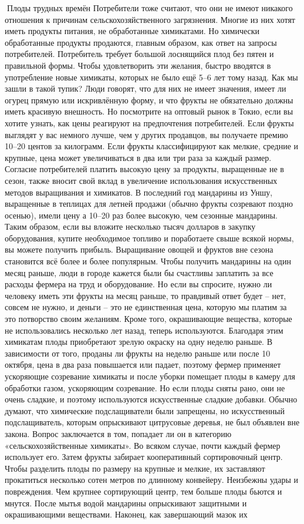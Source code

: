 \documentclass[a4paper]{book}
\begin{document}
Плоды трудных времён
Потребители тоже считают, что они не имеют никакого отношения к причинам
сельскохозяйственного загрязнения. Многие из них хотят иметь продукты питания, не
обработанные химикатами. Но химически обработанные продукты продаются, главным
образом, как ответ на запросы потребителей. Потребитель требует большой лоснящийся
плод без пятен и правильной формы. Чтобы удовлетворить эти желания, быстро вводятся в
употребление новые химикаты, которых не было ещё 5–6 лет тому назад.
Как мы зашли в такой тупик? Люди говорят, что для них не имеет значения, имеет ли
огурец прямую или искривлённую форму, и что фрукты не обязательно должны иметь
красивую внешность. Но посмотрите на оптовый рынок в Токио, если вы хотите узнать, как
цены реагируют на предпочтения потребителей. Если фрукты выглядят у вас немного лучше,
чем у других продавцов, вы получаете премию 10–20 центов за килограмм. Если фрукты
классифицируют как мелкие, средние и крупные, цена может увеличиваться в два или три
раза за каждый размер.
Согласие потребителей платить высокую цену за продукты, выращенные не в сезон,
также вносит свой вклад в увеличение использования искусственных методов выращивания
и химикатов. В последний год мандарины из Уншу, выращенные в теплицах для летней
продажи (обычно фрукты созревают поздно осенью), имели цену а 10–20 раз более высокую,
чем сезонные мандарины. Таким образом, если вы вложите несколько тысяч долларов в
закупку оборудования, купите необходимое топливо и поработаете свыше всякой нормы, вы
можете получить прибыль.
Выращивание овощей и фруктов вне сезона становится всё более и более популярным.
Чтобы получить мандарины на один месяц раньше, люди в городе кажется были бы
счастливы заплатить за все расходы фермера на труд и оборудование. Но если вы спросите,
нужно ли человеку иметь эти фрукты на месяц раньше, то правдивый ответ будет – нет,
совсем не нужно, и деньги – это не единственная цена, которую мы платим за это
потворство своим желаниям.
Кроме того, окрашивающие вещества, которые не использовались несколько лет назад,
теперь используются. Благодаря этим химикатам плоды приобретают зрелую окраску на одну
неделю раньше. В зависимости от того, проданы ли фрукты на неделю раньше или после 10
октября, цена в два раза повышается или падает, поэтому фермер применяет ускоряющие
созревание химикаты и после уборки помещает плоды в камеру для обработки газом,
ускоряющим созревание.
Но если плоды сняты рано, они не очень сладкие, и поэтому используются
искусственные сладкие добавки. Обычно думают, что химические подслащиватели были
запрещены, но искусственный подслащиватель, которым опрыскивают цитрусовые деревья,
не был объявлен вне закона. Вопрос заключается в том, попадает ли он в категорию
«сельскохозяйственные химикаты». Во всяком случае, почти каждый фермер использует его.
Затем фрукты забирает кооперативный сортировочный центр. Чтобы разделить плоды
по размеру на крупные и мелкие, их заставляют прокатиться несколько сотен метров по
длинному конвейеру. Неизбежны удары и повреждения. Чем крупнее сортирующий центр,
тем больше плоды бьются и мнутся. После мытья водой мандарины опрыскивают
защитными и окрашивающими веществами. Наконец, как завершающий мазок их
\end{document}
